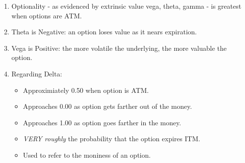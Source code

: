 \documentclass[11pt,]{krantz}
\providecommand{\tightlist}{%
  \setlength{\itemsep}{0pt}\setlength{\parskip}{0pt}}
\begin{document}
\begin{enumerate}
\def\labelenumi{\arabic{enumi}.}
\item
  Optionality - as evidenced by extrinsic value vega, theta, gamma - is greatest when options are ATM.
\item
  Theta is Negative: an option loses value as it nears expiration.
\item
  Vega is Positive: the more volatile the underlying, the more valuable the option.
\item
  Regarding Delta:

  \begin{itemize}
  \tightlist
  \item
    Approximiately 0.50 when option is ATM.\\
  \item
    Approaches 0.00 as option gets farther out of the money.\\
  \item
    Approaches 1.00 as option goes farther in the money.
  \item
    \emph{VERY roughly} the probability that the option expires ITM.
  \item
    Used to refer to the moniness of an option.
  \end{itemize}
\end{enumerate}



\backmatter
\printindex
\end{document}
